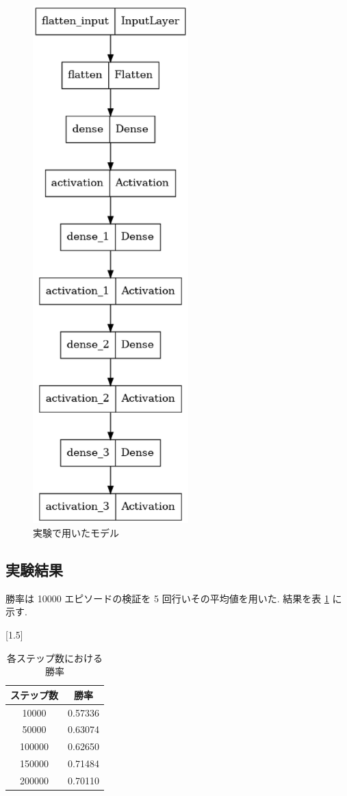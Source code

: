 \documentclass{jarticle}     %
\begin{document}
  \begin{figure}[htbp]
    \centering
    \includegraphics[width=60mm]{assets/model.eps}
    \caption{実験で用いたモデル}
    \label{fig:model}
  \end{figure}
\subsection{実験結果}
勝率は 10000 エピソードの検証を 5 回行いその平均値を用いた.
結果を表 \ref{table:result} に示す.

  
\begin{table}[h]
  \centering
  \caption{各ステップ数における勝率}
  \label{table:result}
  \scalebox{1.5}[1.5]{
    \begin{tabular}{|c|c|}
      \hline
      ステップ数  & 勝率      \\ \hline
      10000  & 0.57336 \\ \hline
      50000  & 0.63074 \\ \hline
      100000 & 0.62650 \\ \hline
      150000 & 0.71484 \\ \hline
      200000 & 0.70110 \\ \hline
      \end{tabular}
  }
  \end{table}
\end{document}
